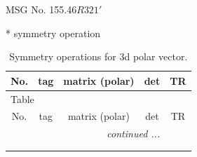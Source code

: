 \documentclass[fleqn,8pt]{jsarticle}
\begin{document}
\setcounter{MaxMatrixCols}{32}

\renewcommand{\tablename}{Table~}
\renewcommand{\figurename}{Figure~}
\begin{center}
\LARGE
MSG No. 155.46\quad$R321'$
\end{center}
* symmetry operation
\renewcommand{\arraystretch}{1.3}
\begin{longtable}{ccccc}
\caption{Symmetry operations for 3d polar vector.}
 \\
 \hline \hline
No. & tag & matrix (polar) & det & TR \\ \hline \endfirsthead

\multicolumn{4}{l}{\tablename\ \thetable{}} \\
 \hline \hline
No. & tag & matrix (polar) & det & TR \\ \hline \endhead

 \hline \hline
\multicolumn{4}{r}{\footnotesize\it continued ...} \\ \endfoot

 \hline \hline
\multicolumn{4}{r}{} \\ \endlastfoot


\end{longtable}
\end{document}
